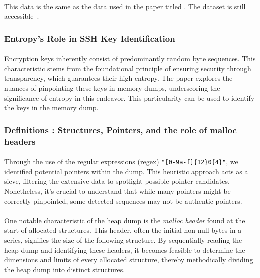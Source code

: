         \paragraph{}This data is the same as the data used in the paper titled  \cite{fellicious_smartkex_2022}. The dataset is still accessible~\cite{fellicious_machine_2022}.
    
    \subsubsection{Entropy's Role in SSH Key Identification}

        \paragraph{}Encryption keys\cite*{fellicious_smartkex_2022} inherently consist of predominantly random byte sequences. This characteristic stems from the foundational principle of ensuring security through transparency, which guarantees their high entropy. The paper explores the nuances of pinpointing these keys in memory dumps, underscoring the significance of entropy in this endeavor. This particularity can be used to identify the keys in the memory dump.
        
    \subsubsection{Definitions : Structures, Pointers, and the role of malloc headers}
    
        \paragraph{}Through the use of the regular expressions (\acrshort{regex}) \texttt{"[0-9a-f]\{12\}0\{4\}"}, we identified potential \glspl{pointer} within the dump. This heuristic approach acts as a sieve, filtering the extensive data to spotlight possible \gls{pointer} candidates. Nonetheless, it's crucial to understand that while many \glspl{pointer} might be correctly pinpointed, some detected sequences may not be authentic \glspl{pointer}.

        \paragraph{}One notable characteristic of the heap dump is the \textit{malloc header} found at the start of allocated \glspl{structure}. This header, often the initial non-null bytes in a series, signifies the size of the following \gls{structure}. By sequentially reading the heap dump and identifying these headers, it becomes feasible to determine the dimensions and limits of every allocated \gls{structure}, thereby methodically dividing the heap dump into distinct \glspl{structure}.
        
